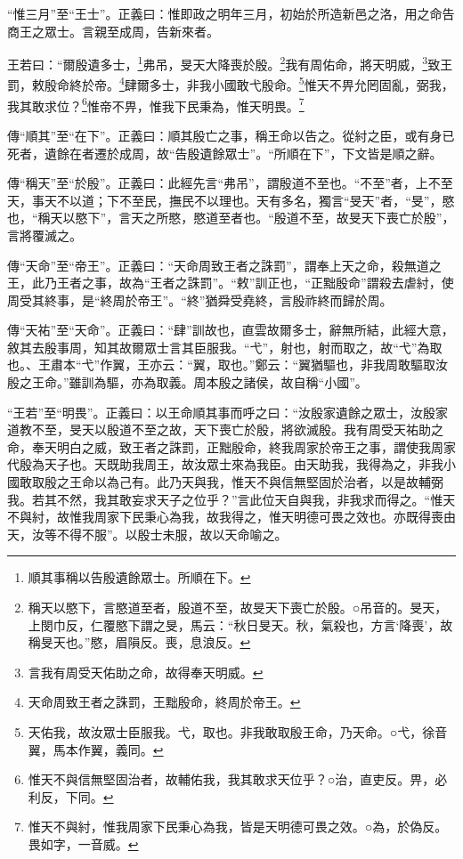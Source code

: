 {\noindent\shu{}\fzkt “惟三月”至“王士”。正義曰：惟即政之明年三月，初始於所造新邑之洛，用之命告商王之眾士。言親至成周，告新來者。 \par}

王若曰：“爾殷遺多士，\footnote{順其事稱以告殷遺餘眾士。所順在下。}弗吊，旻天大降喪於殷。\footnote{稱天以愍下，言愍道至者，殷道不至，故旻天下喪亡於殷。○吊音的。旻天，上閔巾反，仁覆愍下謂之旻，馬云：“秋日旻天。秋，氣殺也，方言‘降喪’，故稱旻天也。”愍，眉隕反。喪，息浪反。}我有周佑命，將天明威，\footnote{言我有周受天佑助之命，故得奉天明威。}致王罰，敕殷命終於帝。\footnote{天命周致王者之誅罰，王黜殷命，終周於帝王。}肆爾多士，非我小國敢弋殷命。\footnote{天佑我，故汝眾士臣服我。弋，取也。非我敢取殷王命，乃天命。○弋，徐音翼，馬本作翼，義同。}惟天不畀允罔固亂，弼我，我其敢求位？\footnote{惟天不與信無堅固治者，故輔佑我，我其敢求天位乎？○治，直吏反。畀，必利反，下同。}惟帝不畀，惟我下民秉為，惟天明畏。\footnote{惟天不與紂，惟我周家下民秉心為我，皆是天明德可畏之效。○為，於偽反。畏如字，一音威。}

{\noindent\zhuan{}\fzbyks 傳“順其”至“在下”。正義曰：順其殷亡之事，稱王命以告之。從紂之臣，或有身已死者，遺餘在者遷於成周，故“告殷遺餘眾士”。“所順在下”，下文皆是順之辭。 \par}

{\noindent\zhuan{}\fzbyks 傳“稱天”至“於殷”。正義曰：此經先言“弗吊”，謂殷道不至也。“不至”者，上不至天，事天不以道；下不至民，撫民不以理也。天有多名，獨言“旻天”者，“旻”，愍也，“稱天以愍下”，言天之所愍，愍道至者也。“殷道不至，故旻天下喪亡於殷”，言將覆滅之。 \par}

{\noindent\zhuan{}\fzbyks 傳“天命”至“帝王”。正義曰：“天命周致王者之誅罰”，謂奉上天之命，殺無道之王，此乃王者之事，故為“王者之誅罰”。“敕”訓正也，“正黜殷命”謂殺去虐紂，使周受其終事，是“終周於帝王”。“終”猶舜受堯終，言殷祚終而歸於周。 \par}

{\noindent\zhuan{}\fzbyks 傳“天祐”至“天命”。正義曰：“肆”訓故也，直雲故爾多士，辭無所結，此經大意，敘其去殷事周，知其故爾眾士言其臣服我。“弋”，射也，射而取之，故“弋”為取也。、王肅本“弋”作翼，王亦云：“翼，取也。”鄭云：“翼猶驅也，非我周敢驅取汝殷之王命。”雖訓為驅，亦為取義。周本殷之諸侯，故自稱“小國”。 \par}

{\noindent\shu{}\fzkt “王若”至“明畏”。正義曰：以王命順其事而呼之曰：“汝殷家遺餘之眾士，汝殷家道教不至，旻天以殷道不至之故，天下喪亡於殷，將欲滅殷。我有周受天祐助之命，奉天明白之威，致王者之誅罰，正黜殷命，終我周家於帝王之事，謂使我周家代殷為天子也。天既助我周王，故汝眾士來為我臣。由天助我，我得為之，非我小國敢取殷之王命以為己有。此乃天與我，惟天不與信無堅固於治者，以是故輔弼我。若其不然，我其敢妄求天子之位乎？”言此位天自與我，非我求而得之。“惟天不與紂，故惟我周家下民秉心為我，故我得之，惟天明德可畏之效也。亦既得喪由天，汝等不得不服”。以殷士未服，故以天命喻之。 \par}

